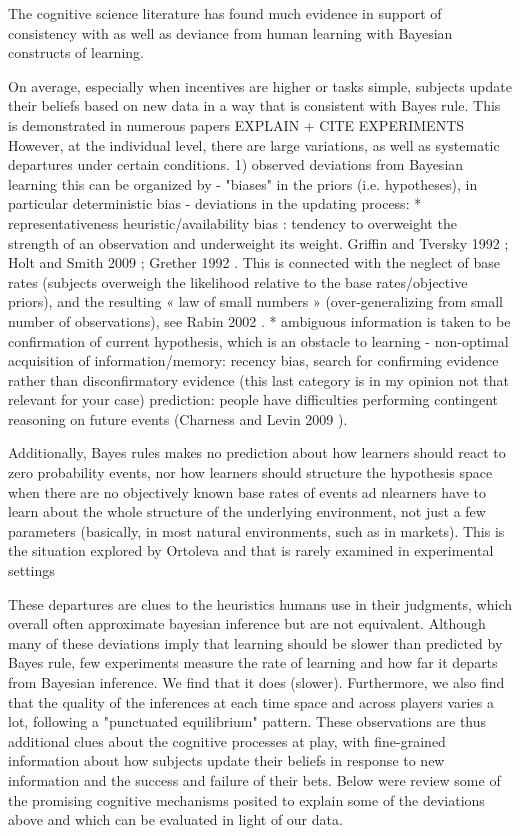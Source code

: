 The cognitive science literature has found much evidence in support of consistency with as well as deviance from human learning with Bayesian constructs of learning. 

On average, especially when incentives are higher or tasks simple, subjects update their beliefs based on new data in a way that is consistent with Bayes rule.  This is demonstrated in numerous papers \cite{Griffiths2008}EXPLAIN + CITE EXPERIMENTS
However, at the individual level, there are large variations, as well as systematic departures under certain conditions. 
1) observed deviations from Bayesian learning
this can be organized by 
- "biases" in the priors (i.e. hypotheses), in particular deterministic bias
- deviations in the updating process: 
* representativeness heuristic/availability bias : tendency to overweight the strength of an observation and underweight its weight. Griffin and Tversky 1992 \cite{griffin1992weighing}; Holt and Smith 2009 \cite{holt2009update} ; Grether 1992 \cite{grether1992testing}. This is connected with the neglect of base rates (subjects overweigh the likelihood relative to the base rates/objective priors), and the resulting « law of small numbers » (over-generalizing from small number of observations), see Rabin 2002 \cite{rabin2002perspective}.
* ambiguous information is taken to be confirmation of current hypothesis, which is an obstacle to learning
- non-optimal acquisition of information/memory: recency bias, search for confirming evidence rather than disconfirmatory evidence (this last category is in my opinion not that relevant for your case)
prediction: people have difficulties performing contingent reasoning on future events (Charness and Levin 2009 \cite{charness2009origin}).

Additionally, Bayes rules makes no prediction about how learners should react to zero probability events, nor how learners should structure the hypothesis space when there are no objectively known base rates of events ad nlearners have to learn about the whole structure of the underlying environment, not just a few parameters (basically, in most natural environments, such as in markets). This is the situation explored by Ortoleva \cite{ortoleva2012modeling} and that is rarely examined in experimental settings 

These departures are clues to the heuristics humans use in their judgments, which overall often approximate bayesian inference but are not equivalent. 
Although many of these deviations imply that learning should be slower than predicted by Bayes rule,  few experiments measure the rate of learning and how far it departs from Bayesian inference. We find that it does (slower). Furthermore, we also find that the quality of the inferences at each time space and across players varies a lot, following a "punctuated equilibrium" pattern. These observations are thus additional clues about the cognitive processes at play, with fine-grained information about how subjects update their beliefs in response to new information and the success and failure of their bets. Below were review some of the promising cognitive mechanisms posited to explain some of the deviations above and which can be evaluated in light of our data.

